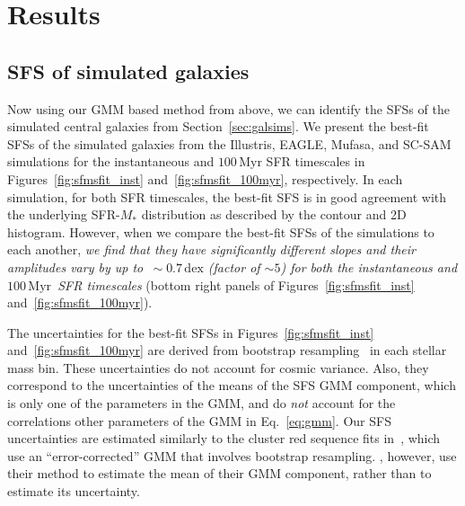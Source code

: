 \documentclass[tighten, preprint]{aastex62}
\newcommand{\hunmyr}{$100\,\mathrm{Myr}$}
\begin{document}
\section{Results} \label{sec:results}
\subsection{SFS of simulated galaxies} \label{sec:sfs}
Now using our GMM based method from above, %
we can identify the SFSs of the simulated central galaxies from 
Section~\ref{sec:galsims}. We present the best-fit SFSs of the 
simulated galaxies from the Illustris, EAGLE, {\sc Mufasa}, and SC-SAM 
simulations for the instantaneous and $100\,\mathrm{Myr}$ SFR 
timescales in Figures~\ref{fig:sfmsfit_inst} and~\ref{fig:sfmsfit_100myr}, 
respectively. In each simulation, for both SFR timescales, the best-fit SFS is 
in good agreement with the underlying SFR-$M_*$ distribution as described 
by the contour and 2D histogram. However, when we compare the best-fit SFSs 
of the simulations to each another, \emph{we find that they have significantly 
different slopes and their amplitudes vary by up to 
$\,{\sim}0.7\,\mathrm{dex}$ (factor of ${\sim}5$) 
for both the instantaneous and \hunmyr~SFR timescales} 
(bottom right panels of Figures~\ref{fig:sfmsfit_inst} and~\ref{fig:sfmsfit_100myr}).

The uncertainties for the best-fit SFSs in Figures~\ref{fig:sfmsfit_inst} 
and~\ref{fig:sfmsfit_100myr} are derived from bootstrap resampling~\citep{efron1979} 
in each stellar mass bin. These uncertainties do not account for cosmic 
variance. %
Also, they correspond to the uncertainties of the means of the SFS GMM component, 
which is only one of the parameters in the GMM, and do \emph{not} account for 
the correlations other parameters of the GMM in Eq.~\ref{eq:gmm}. 
Our SFS uncertainties are estimated 
similarly to the cluster red sequence fits in~\cite{hao2009}, which use an 
``error-corrected'' GMM that involves bootstrap resampling. \cite{hao2009}, 
however, use their method to estimate the mean of their GMM component, 
rather than to estimate its uncertainty.
\end{document}
